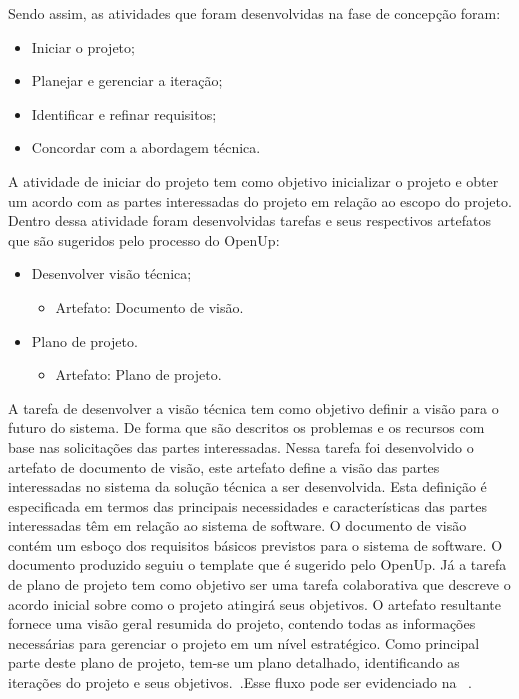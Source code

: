 Sendo assim, as atividades que foram desenvolvidas na fase de concepção foram:
\begin{itemize}
    \item Iniciar o projeto;
    \item Planejar e gerenciar a iteração;
    \item Identificar e refinar requisitos;
    \item Concordar com a abordagem técnica.
\end{itemize}

A atividade de iniciar do projeto tem como objetivo inicializar o projeto e obter um acordo com as partes interessadas do projeto em relação ao escopo do projeto. Dentro dessa atividade foram desenvolvidas tarefas e seus respectivos artefatos que são sugeridos pelo processo do \acrfull{OpenUp}:

\begin{itemize}
    \item Desenvolver visão técnica;
        \begin{itemize}
            \item Artefato: Documento de visão.
        \end{itemize}
    \item Plano de projeto.
    \begin{itemize}
            \item Artefato: Plano de projeto.
        \end{itemize}
\end{itemize}


%

A tarefa de desenvolver a visão técnica tem como objetivo definir a visão para o futuro do sistema. De forma que são descritos os problemas e os recursos com base nas solicitações das partes interessadas. Nessa tarefa foi desenvolvido o artefato de documento de visão, este artefato define a visão das partes interessadas no sistema da solução técnica a ser desenvolvida. Esta definição é especificada em termos das principais necessidades e características das partes interessadas têm em relação ao sistema de software. O documento de visão contém um esboço dos requisitos básicos previstos para o sistema de software. O documento produzido seguiu o template que é sugerido pelo \acrfull{OpenUp}.
Já a tarefa de plano de projeto tem como objetivo ser uma tarefa colaborativa que descreve o acordo inicial sobre como o projeto atingirá seus objetivos. O artefato resultante  fornece uma visão geral resumida do projeto, contendo todas as informações necessárias para gerenciar o projeto em um nível estratégico. Como principal parte deste plano de projeto, tem-se um plano detalhado, identificando as iterações do projeto e seus objetivos.~\cite{openup}.Esse fluxo pode ser evidenciado na ~.

